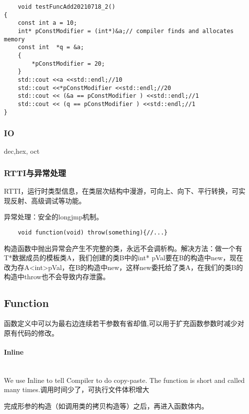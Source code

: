 \documentclass[UTF8]{../computerUniverse}
\begin{document}
\begin{lstlisting}
    void testFuncAdd20210718_2()
{
    const int a = 10;
	int* pConstModifier = (int*)&a;// compiler finds and allocates memory
	const int  *q = &a;
	{
		*pConstModifier = 20;
	}
	std::cout <<a <<std::endl;//10
	std::cout <<*pConstModifier <<std::endl;//20
	std::cout << (&a == pConstModifier ) <<std::endl;//1
	std::cout << (q == pConstModifier ) <<std::endl;//1
}
\end{lstlisting}



\subsubsection{IO}

dec,hex, oct

\subsubsection{RTTI与异常处理}
RTTI，运行时类型信息，在类层次结构中漫游，可向上、向下、平行转换，可实现反射、高级调试等功能。

异常处理：安全的longjmp机制。
\begin{lstlisting}
    void function(void) throw(something){//...}
\end{lstlisting}
构造函数中抛出异常会产生不完整的类，永远不会调析构。解决方法：做一个有T*数据成员的模板类A，我们创建的类B中的int* pVal要在B的构造中new，现在改为存A<int>pVal，在B的构造中new，这样new委托给了类A，在我们的类B的构造中throw也不会导致内存泄露。








\subsection{Function}
函数定义中可以为最右边连续若干参数有省却值,可以用于扩充函数参数时减少对原有代码的修改。
\paragraph{Inline} \quad\\
We use Inline to tell Compiler to do copy-paste. The function is short and called many times.调用时间少了，可执行文件体积增大

完成形参的构造（如调用类的拷贝构造等）之后，再进入函数体内。
\begin{lstlisting}


    
\end{lstlisting}
\end{document}

